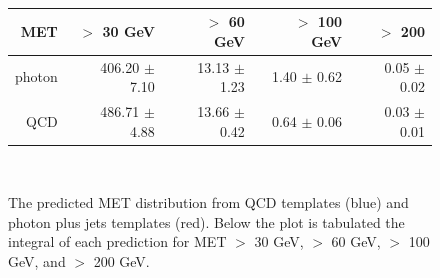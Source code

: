 \begin{figure}[hbt]
  \begin{center}
	\\ \medskip
    \begin{tabular}{r|r|r|r|r}
      MET    & $>$ 30 GeV       & $>$ 60 GeV        & $>$ 100 GeV       & $>$ 200  \\ \hline

	  photon & 406.20 $\pm$   7.10 &  13.13 $\pm$   1.23 &   1.40 $\pm$   0.62 &   0.05 $\pm$   0.02 \\
	  QCD    & 486.71 $\pm$   4.88 &  13.66 $\pm$   0.42 &   0.64 $\pm$   0.06 &   0.03 $\pm$   0.01 \\

    \end{tabular}
	\\ \medskip
    \caption{The predicted MET distribution from QCD templates (blue) and photon plus jets
	  templates (red). %
	  Below the plot is tabulated the integral of each prediction for
	  MET $>$ 30 GeV, $>$ 60 GeV, $>$ 100 GeV, and $>$ 200 GeV. 
	}
    \label{fig:comptemp}
  \end{center}
\end{figure}

